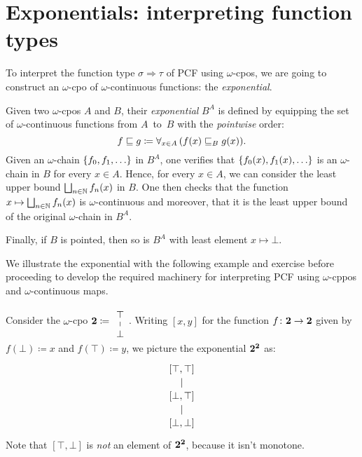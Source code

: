 \section{Exponentials: interpreting function types}

To interpret the function type \(\sigma \Rightarrow \tau\) of PCF using
\(\omega\)-cpos, we are going to construct an \(\omega\)-cpo of
\(\omega\)-continuous functions: the \emph{exponential}.

\begin{definition}\label{def:exponential}
  Given two \(\omega\)-cpos \(A\) and \(B\), their \emph{exponential} \(B^A\) is
  defined by equipping the set of \(\omega\)-continuous functions from
  \(A\)~to~\(B\) with the \emph{pointwise} order:
  \[
    f \sqsubseteq g
    \coloneqq \forall_{x \in A} \, (f(x) \sqsubseteq_B g(x)).
  \]
  Given an \(\omega\)-chain \(\set{f_0,f_1,\dots}\) in \(B^A\), one verifies
  that \(\set{f_0(x),f_1(x),\dots}\) is an \(\omega\)-chain in \(B\) for every
  \(x \in A\).
  Hence, for every \(x \in A\), we can consider the least upper bound
  \(\bigsqcup_{n \in \mathbb N}f_n(x)\) in \(B\).
  One then checks that the function \(x \mapsto \bigsqcup_{n \in \mathbb N}f_n(x)\)
  is \(\omega\)-continuous and moreover, that it is the least upper bound of the
  original \(\omega\)-chain in \(B^A\).

  Finally, if \(B\) is pointed, then so is \(B^A\) with least
  element \(x \mapsto \bot\).
\end{definition}

We illustrate the exponential with the following example and exercise before
proceeding to develop the required machinery for interpreting PCF using
\(\omega\)-cppos and \(\omega\)-continuous maps.

\begin{example}
  Consider the \(\omega\)-cpo \(\Two \coloneqq
  \begin{tikzcd}[row sep=5pt]
    \top \ar[d,no head] \\ \bot
  \end{tikzcd}\). Writing \([x,y]\) for the function
  \({f \colon \mathbf 2 \to \mathbf 2}\) given by \(f(\bot) \coloneqq x\) and
  \(f(\top) \coloneqq y\), we picture the exponential \(\mathbf 2^\mathbf 2\) as:
  \[
  \begin{tikzcd}[row sep=10pt]
    {[\top,\top]} \ar[d, no head] \\
    {[\bot,\top]} \ar[d, no head] \\
    {[\bot,\bot]}
  \end{tikzcd}
  \]
  Note that \([\top,\bot]\) is \emph{not} an element of \(\mathbf 2^\mathbf 2\), because
  it isn't monotone.
\end{example}

